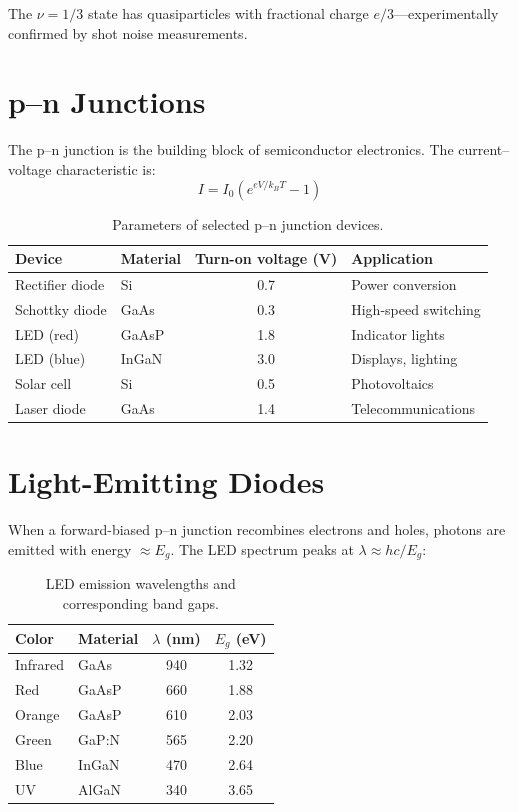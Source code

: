 The $\nu = 1/3$ state has quasiparticles with fractional charge $e/3$---experimentally confirmed by shot noise measurements.


\section{p--n Junctions}

The p--n junction is the building block of semiconductor electronics. The current--voltage characteristic is:
\begin{equation}
  I = I_0\left(e^{eV/k_BT} - 1\right)
\end{equation}

\begin{table}[H]
\centering
\caption{Parameters of selected p--n junction devices.}
\label{tab:pn}
\begin{tabular}{@{}llSl@{}}
\toprule
Device & Material & {Turn-on voltage (\si{\volt})} & Application \\
\midrule
Rectifier diode & Si     & 0.7  & Power conversion \\
Schottky diode  & GaAs   & 0.3  & High-speed switching \\
LED (red)       & GaAsP  & 1.8  & Indicator lights \\
LED (blue)      & InGaN  & 3.0  & Displays, lighting \\
Solar cell      & Si     & 0.5  & Photovoltaics \\
Laser diode     & GaAs   & 1.4  & Telecommunications \\
\bottomrule
\end{tabular}
\end{table}

\section{Light-Emitting Diodes}

When a forward-biased p--n junction recombines electrons and holes, photons are emitted with energy $\approx E_g$. The LED spectrum peaks at $\lambda \approx hc/E_g$:

\begin{table}[H]
\centering
\caption{LED emission wavelengths and corresponding band gaps.}
\label{tab:led}
\begin{tabular}{@{}llSS@{}}
\toprule
Color & Material & {$\lambda$ (\si{\nano\metre})} & {$E_g$ (\si{\electronvolt})} \\
\midrule
Infrared & GaAs      & 940  & 1.32 \\
Red      & GaAsP     & 660  & 1.88 \\
Orange   & GaAsP     & 610  & 2.03 \\
Green    & GaP:N     & 565  & 2.20 \\
Blue     & InGaN     & 470  & 2.64 \\
UV       & AlGaN     & 340  & 3.65 \\
\bottomrule
\end{tabular}
\end{table}

